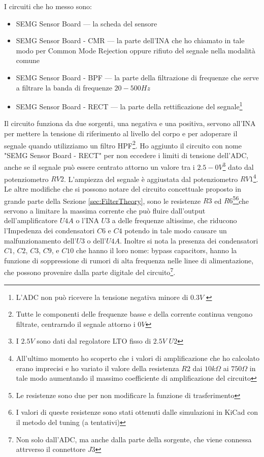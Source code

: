 \documentclass[a4paper, 10pt, final]{article} %
\newcommand{\parenciteit}[2]{\textit{\parencite[#1]{#2}}} %
\begin{document}
    \noindent I circuiti che ho messo sono:
    \begin{itemize}
        \item SEMG Sensor Board --- la scheda del sensore
        \item SEMG Sensor Board - CMR --- la parte dell'INA che ho chiamato in tale modo per Common Mode Rejection oppure rifiuto del segnale nella modalit\`{a} comune
        \item SEMG Sensor Board - BPF --- la parte della filtrazione di frequenze che serve a filtrare la banda di frequenze $20-500Hz$
        \item SEMG Sensor Board - RECT --- la parte della rettificazione del segnale\footnote{L'ADC non pu\`{o} ricevere la tensione negativa minore di $0.3V$ \parenciteit{p8}{TLV2541:Datasheet}}
    \end{itemize}
    Il circuito funziona da due sorgenti, una negativa e una positiva, servono all'INA per mettere la tensione di riferimento al livello del corpo e per adoperare il segnale quando utilizziamo un filtro HPF\footnote{Tutte le componenti delle frequenze basse e della corrente continua vengono filtrate, centrarndo il segnale attorno i $0V$}.
    Ho aggiunto il circuito con nome "SEMG Sensor Board - RECT" per non eccedere i limiti di tensione dell'ADC, anche se il segnale pu\`{o} essere centrato attorno un valore tra i $2.5-0V$\footnote{I $2.5V$ sono dati dal regolatore LTO fisso di $2.5V$ $U2$} dato dal potenziometro $RV2$.
    L'ampiezza del segnale \`{e} aggiustata dal potenziometro $RV1$\footnote{All'ultimo momento ho scoperto che i valori di amplificazione che ho calcolato erano imprecisi e ho variato il valore della resistenza $R2$ dai $10k\Omega$ ai $750\Omega$ in tale modo aumentando il massimo coefficiente di amplificazione del circuito}.
    Le altre modifiche che si possono notare del circuito concettuale proposto in grande parte della Sezione \ref{sec:FilterTheory}, sono le resistenze $R3$ ed $R6$\footnote{Le resistenze sono due per non modificare la funzione di trasferimento}\:\footnote{I valori di queste resistenze sono stati ottenuti dalle simulazioni in KiCad con il metodo del tuning (a tentativi)}che servono a limitare la massima corrente che pu\`{o} fluire dall'output dell'amplificatore $U4A$ o l'INA $U3$ a delle frequenze altissime, che riducono l'Impedenza dei condensatori $C6$ e $C4$ potendo in tale modo causare un malfunzionamento dell'$U3$ o dell'$U4A$.
    Inoltre si nota la presenza dei condensatori $C1$, $C2$, $C3$, $C9$, e $C10$ che hanno il loro nome: bypass capacitors, hanno la funzione di soppressione di rumori di alta frequenza nelle linee di alimentazione, che possono provenire dalla parte digitale del circuito\footnote{Non solo dall'ADC, ma anche dalla parte della sorgente, che viene connessa attrverso il connettore $J3$}.
\end{document}
